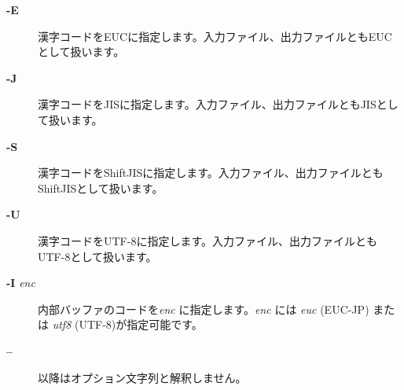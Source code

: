 \documentclass[10pt,dvipdfmx]{jsarticle}
\begin{document}
\begin{description}
\item[\textbf{-E}
] 漢字コードをEUCに指定します。入力ファイル、出力ファイルともEUCとして扱います。

\end{description}
\begin{description}
\item[\textbf{-J}
] 漢字コードをJISに指定します。入力ファイル、出力ファイルともJISとして扱います。

\end{description}
\begin{description}
\item[\textbf{-S}
] 漢字コードをShiftJISに指定します。入力ファイル、出力ファイルともShiftJISとして扱います。

\end{description}
\begin{description}
\item[\textbf{-U}
] 漢字コードをUTF-8に指定します。入力ファイル、出力ファイルともUTF-8として扱います。

\end{description}
\begin{description}
\item[\textbf{-I}
\emph{ enc}
] 内部バッファのコードを\emph{enc}
 に指定します。\emph{enc}
 には \emph{euc}
(EUC-JP) または \emph{utf8}
(UTF-8)が指定可能です。

\end{description}
\begin{description}
\item[\textbf{--}
] 以降はオプション文字列と解釈しません。    

\end{description}
\end{document}
